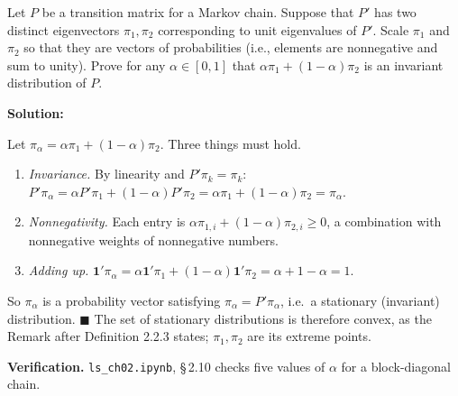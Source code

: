\documentclass[12pt, letterpaper]{article}
\newcommand{\nb}[1]{\texttt{ls\_ch02.ipynb}, \S\,#1}
\begin{document}
\begin{tcolorbox}[evenbox,title={Exercise 2.10 \quad Convex Combinations of Stationary Distributions}]
\begin{tcolorbox}[questionbox]
Let $P$ be a transition matrix for a Markov chain. Suppose that $P'$ has two distinct eigenvectors
$\pi_1,\pi_2$ corresponding to unit eigenvalues of $P'$. Scale $\pi_1$ and $\pi_2$ so that they are
vectors of probabilities (i.e., elements are nonnegative and sum to unity). Prove for any
$\alpha\in[0,1]$ that $\alpha\pi_1+(1-\alpha)\pi_2$ is an invariant distribution of $P$.
\end{tcolorbox}

\textbf{Solution:}

Let $\pi_\alpha=\alpha\pi_1+(1-\alpha)\pi_2$. Three things must hold.
\begin{enumerate}[label=(\roman*)]
\item \emph{Invariance.} By linearity and $P'\pi_k=\pi_k$:
$P'\pi_\alpha=\alpha P'\pi_1+(1-\alpha)P'\pi_2=\alpha\pi_1+(1-\alpha)\pi_2=\pi_\alpha$.
\item \emph{Nonnegativity.} Each entry is $\alpha\pi_{1,i}+(1-\alpha)\pi_{2,i}\ge0$, a combination with
nonnegative weights of nonnegative numbers.
\item \emph{Adding up.} $\mathbf 1'\pi_\alpha=\alpha\mathbf 1'\pi_1+(1-\alpha)\mathbf 1'\pi_2=\alpha+1-\alpha=1$.
\end{enumerate}
So $\pi_\alpha$ is a probability vector satisfying $\pi_\alpha=P'\pi_\alpha$, i.e.\ a stationary
(invariant) distribution. $\blacksquare$ The set of stationary distributions is therefore convex, as
the Remark after Definition 2.2.3 states; $\pi_1,\pi_2$ are its extreme points.

\textbf{Verification.} \nb{2.10} checks five values of $\alpha$ for a block-diagonal chain. \checkmark
\end{tcolorbox}
\end{document}
